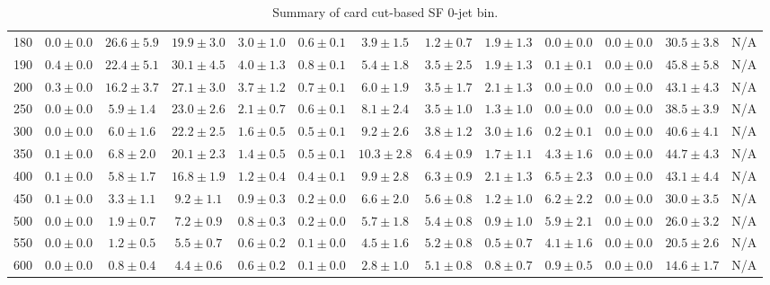 \begin{table}
{\begin{center}
\begin{tabular}{l | c c | c c c c c c c c  | c c}
180 & $0.0\pm0.0$ & $26.6\pm5.9$ & $19.9\pm3.0$ & $3.0\pm1.0$ & $0.6\pm0.1$ & $3.9\pm1.5$ & $1.2\pm0.7$ & $1.9\pm1.3$ & $0.0\pm0.0$ & $0.0\pm0.0$ & $30.5\pm3.8$ & N/A \\
190 & $0.4\pm0.0$ & $22.4\pm5.1$ & $30.1\pm4.5$ & $4.0\pm1.3$ & $0.8\pm0.1$ & $5.4\pm1.8$ & $3.5\pm2.5$ & $1.9\pm1.3$ & $0.1\pm0.1$ & $0.0\pm0.0$ & $45.8\pm5.8$ & N/A \\
200 & $0.3\pm0.0$ & $16.2\pm3.7$ & $27.1\pm3.0$ & $3.7\pm1.2$ & $0.7\pm0.1$ & $6.0\pm1.9$ & $3.5\pm1.7$ & $2.1\pm1.3$ & $0.0\pm0.0$ & $0.0\pm0.0$ & $43.1\pm4.3$ & N/A \\
250 & $0.0\pm0.0$ & $5.9\pm1.4$ & $23.0\pm2.6$ & $2.1\pm0.7$ & $0.6\pm0.1$ & $8.1\pm2.4$ & $3.5\pm1.0$ & $1.3\pm1.0$ & $0.0\pm0.0$ & $0.0\pm0.0$ & $38.5\pm3.9$ & N/A \\
300 & $0.0\pm0.0$ & $6.0\pm1.6$ & $22.2\pm2.5$ & $1.6\pm0.5$ & $0.5\pm0.1$ & $9.2\pm2.6$ & $3.8\pm1.2$ & $3.0\pm1.6$ & $0.2\pm0.1$ & $0.0\pm0.0$ & $40.6\pm4.1$ & N/A \\
350 & $0.1\pm0.0$ & $6.8\pm2.0$ & $20.1\pm2.3$ & $1.4\pm0.5$ & $0.5\pm0.1$ & $10.3\pm2.8$ & $6.4\pm0.9$ & $1.7\pm1.1$ & $4.3\pm1.6$ & $0.0\pm0.0$ & $44.7\pm4.3$ & N/A \\
400 & $0.1\pm0.0$ & $5.8\pm1.7$ & $16.8\pm1.9$ & $1.2\pm0.4$ & $0.4\pm0.1$ & $9.9\pm2.8$ & $6.3\pm0.9$ & $2.1\pm1.3$ & $6.5\pm2.3$ & $0.0\pm0.0$ & $43.1\pm4.4$ & N/A \\
450 & $0.1\pm0.0$ & $3.3\pm1.1$ & $9.2\pm1.1$ & $0.9\pm0.3$ & $0.2\pm0.0$ & $6.6\pm2.0$ & $5.6\pm0.8$ & $1.2\pm1.0$ & $6.2\pm2.2$ & $0.0\pm0.0$ & $30.0\pm3.5$ & N/A \\
500 & $0.0\pm0.0$ & $1.9\pm0.7$ & $7.2\pm0.9$ & $0.8\pm0.3$ & $0.2\pm0.0$ & $5.7\pm1.8$ & $5.4\pm0.8$ & $0.9\pm1.0$ & $5.9\pm2.1$ & $0.0\pm0.0$ & $26.0\pm3.2$ & N/A \\
550 & $0.0\pm0.0$ & $1.2\pm0.5$ & $5.5\pm0.7$ & $0.6\pm0.2$ & $0.1\pm0.0$ & $4.5\pm1.6$ & $5.2\pm0.8$ & $0.5\pm0.7$ & $4.1\pm1.6$ & $0.0\pm0.0$ & $20.5\pm2.6$ & N/A \\
600 & $0.0\pm0.0$ & $0.8\pm0.4$ & $4.4\pm0.6$ & $0.6\pm0.2$ & $0.1\pm0.0$ & $2.8\pm1.0$ & $5.1\pm0.8$ & $0.8\pm0.7$ & $0.9\pm0.5$ & $0.0\pm0.0$ & $14.6\pm1.7$ & N/A \\
\hline
\end{tabular}
\end{center}
}
\caption{Summary of card cut-based SF 0-jet bin.}
\end{table}

